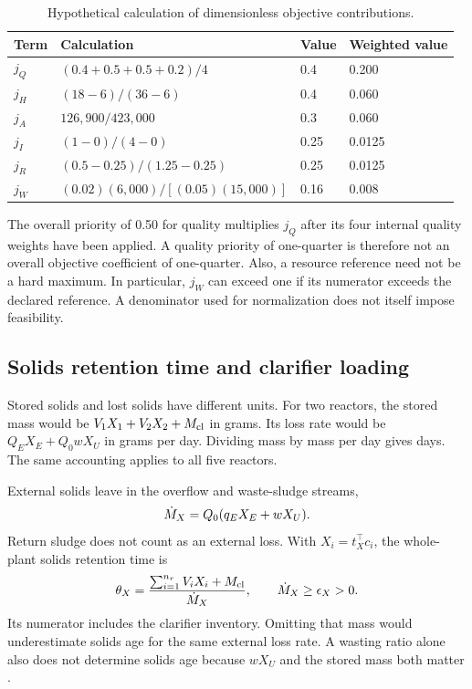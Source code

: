 \begin{table}[htbp]
\centering\small
\caption{Hypothetical calculation of dimensionless objective contributions.}
\label{tab:plant_hypothetical_objective}
\begin{tabular}{llll}
\toprule Term & Calculation & Value & Weighted value\\\midrule
$j_Q$ & $(0.4+0.5+0.5+0.2)/4$ & 0.4 & 0.200\\
$j_H$ & $(18-6)/(36-6)$ & 0.4 & 0.060\\
$j_A$ & $126{,}900/423{,}000$ & 0.3 & 0.060\\
$j_I$ & $(1-0)/(4-0)$ & 0.25 & 0.0125\\
$j_R$ & $(0.5-0.25)/(1.25-0.25)$ & 0.25 & 0.0125\\
$j_W$ & $(0.02)(6{,}000)/[(0.05)(15{,}000)]$ & 0.16 & 0.008\\
\bottomrule
\end{tabular}
\end{table}

The overall priority of 0.50 for quality multiplies $j_Q$ after its four internal quality weights have been applied. A quality priority of one-quarter is therefore not an overall objective coefficient of one-quarter. Also, a resource reference need not be a hard maximum. In particular, $j_W$ can exceed one if its numerator exceeds the declared reference. A denominator used for normalization does not itself impose feasibility.

\subsection{Solids retention time and clarifier loading}

Stored solids and lost solids have different units. For two reactors, the stored mass would be $V_1X_1+V_2X_2+M_{\rm cl}$ in grams. Its loss rate would be $Q_EX_E+Q_0wX_U$ in grams per day. Dividing mass by mass per day gives days. The same accounting applies to all five reactors.

External solids leave in the overflow and waste-sludge streams,
\begin{equation}
\equationname{External solids loss through effluent and waste sludge}
\dot M_X=Q_0(q_EX_E+wX_U).
\label{eq:plant_external_solids_loss}
\end{equation}
Return sludge does not count as an external loss. With $X_i=t_X^\top c_i$, the whole-plant solids retention time is
\begin{equation}
\equationname{Plant solids retention time from inventory and external loss}
\theta_X=\frac{\sum_{i=1}^{n_r}V_iX_i+M_{\rm cl}}{\dot M_X},
\qquad\dot M_X\ge\epsilon_X>0.
\label{eq:plant_solids_age}
\end{equation}
Its numerator includes the clarifier inventory. Omitting that mass would underestimate solids age for the same external loss rate. A wasting ratio alone also does not determine solids age because $wX_U$ and the stored mass both matter \citep{Alex2008}.

